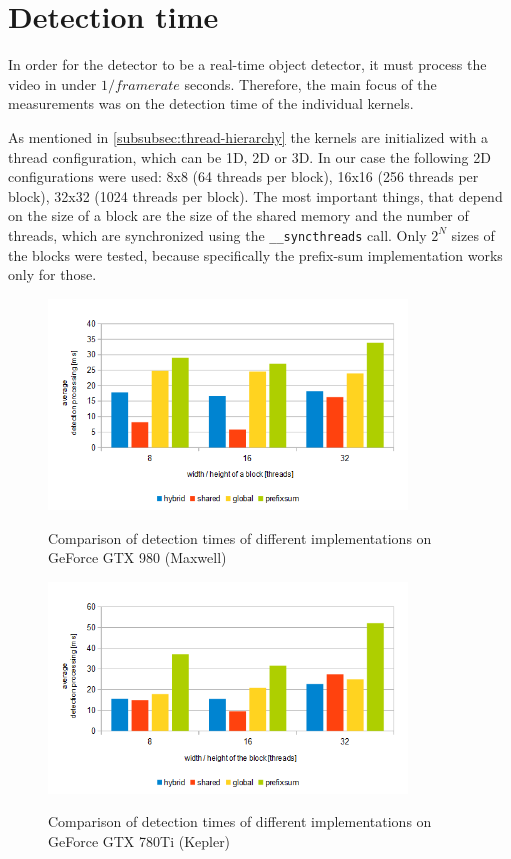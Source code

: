 \section{Detection time}\label{sec:detection-time}

In order for the detector to be a real-time object detector, it must process the video in under $1/framerate$ seconds. Therefore, the main focus of the measurements was on the detection time of the individual kernels.

As mentioned in \ref{subsubsec:thread-hierarchy} the kernels are initialized with a thread configuration, which can be 1D, 2D or 3D. In our case the following 2D configurations were used: 8x8 (64 threads per block), 16x16 (256 threads per block), 32x32 (1024 threads per block). The most important things, that depend on the size of a block are the size of the shared memory and the number of threads, which are synchronized using the \verb|__syncthreads| call. Only $2^N$ sizes of the blocks were tested, because specifically the prefix-sum implementation works only for those.

\begin{center}
\begin{figure}[h]
	\centering\includegraphics[width=0.85\textwidth]{fig/1080_detection_maxwell.png}\label{fig:980-det-measurement}
	\caption{Comparison of detection times of different implementations on GeForce GTX 980 (Maxwell)}
\end{figure}
\end{center}

\begin{center}
\begin{figure}[h]
	\centering\includegraphics[width=0.85\textwidth]{fig/1080_detection_kepler.png}\label{fig:780ti-det-measurement}
	\caption{Comparison of detection times of different implementations on GeForce GTX 780Ti (Kepler)}
\end{figure}
\end{center}

